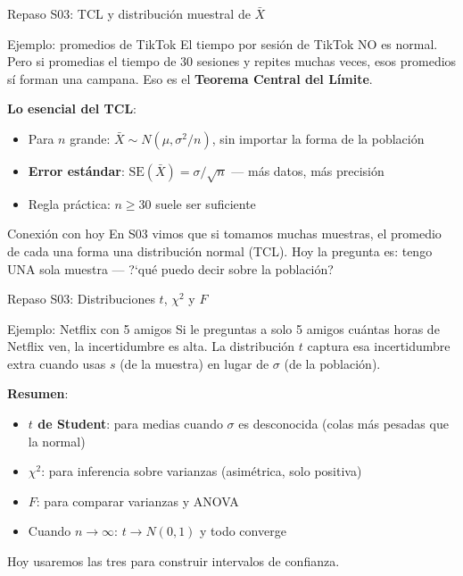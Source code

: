 \documentclass[aspectratio=169, 11pt]{beamer}
\begin{document}
\begin{frame}{Repaso S03: TCL y distribuci\'on muestral de $\bar{X}$}
\small
\begin{exampleblock}{Ejemplo: promedios de TikTok}
El tiempo por sesi\'on de TikTok NO es normal. Pero si promedias el tiempo de 30 sesiones y repites muchas veces, esos promedios s\'i forman una campana. Eso es el \textbf{Teorema Central del L\'imite}.
\end{exampleblock}

\textbf{Lo esencial del TCL}:
\begin{itemize}\setlength{\itemsep}{1pt}
  \item Para $n$ grande: $\bar{X} \sim N(\mu, \sigma^2/n)$, sin importar la forma de la poblaci\'on
  \item \textbf{Error est\'andar}: $\text{SE}(\bar{X}) = \sigma/\sqrt{n}$ --- m\'as datos, m\'as precisi\'on
  \item Regla pr\'actica: $n \geq 30$ suele ser suficiente
\end{itemize}

\begin{alertblock}{Conexi\'on con hoy}
En S03 vimos que si tomamos muchas muestras, el promedio de cada una forma una distribuci\'on normal (TCL). Hoy la pregunta es: tengo \alert{UNA sola muestra} --- ?`qu\'e puedo decir sobre la poblaci\'on?
\end{alertblock}
\end{frame}

\begin{frame}{Repaso S03: Distribuciones $t$, $\chi^2$ y $F$}
\small
\begin{exampleblock}{Ejemplo: Netflix con 5 amigos}
Si le preguntas a solo 5 amigos cu\'antas horas de Netflix ven, la incertidumbre es alta. La distribuci\'on $t$ captura esa incertidumbre extra cuando usas $s$ (de la muestra) en lugar de $\sigma$ (de la poblaci\'on).
\end{exampleblock}

\textbf{Resumen}:
\begin{itemize}\setlength{\itemsep}{1pt}
  \item \textbf{$t$ de Student}: para medias cuando $\sigma$ es desconocida (colas m\'as pesadas que la normal)
  \item \textbf{$\chi^2$}: para inferencia sobre varianzas (asim\'etrica, solo positiva)
  \item \textbf{$F$}: para comparar varianzas y ANOVA
  \item Cuando $n \to \infty$: $t \to N(0,1)$ y todo converge
\end{itemize}

\alert{Hoy usaremos las tres para construir intervalos de confianza.}
\end{frame}
\end{document}
